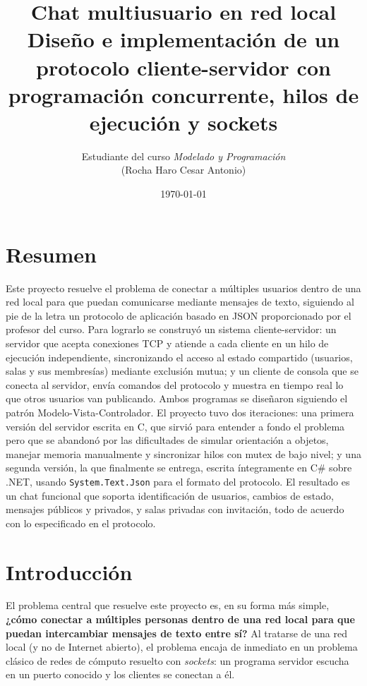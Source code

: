 \documentclass[11pt,letterpaper]{article}
\title{\textbf{Chat multiusuario en red local}\\[0.3em]
  \large Diseño e implementación de un protocolo cliente-servidor con\\
  programación concurrente, hilos de ejecución y sockets}
\author{Estudiante del curso \emph{Modelado y Programación}\\ \small(Rocha Haro Cesar Antonio)}
\date{\today}
\begin{document}
\maketitle
\thispagestyle{empty}
\tableofcontents
\newpage

\section{Resumen}

Este proyecto resuelve el problema de conectar a múltiples usuarios dentro
de una red local para que puedan comunicarse mediante mensajes de texto,
siguiendo al pie de la letra un protocolo de aplicación basado en JSON
proporcionado por el profesor del curso. Para lograrlo se construyó un
sistema cliente-servidor: un servidor que acepta conexiones TCP y atiende a
cada cliente en un hilo de ejecución independiente, sincronizando el acceso
al estado compartido (usuarios, salas y sus membresías) mediante exclusión
mutua; y un cliente de consola que se conecta al servidor, envía comandos
del protocolo y muestra en tiempo real lo que otros usuarios van
publicando. Ambos programas se diseñaron siguiendo el patrón
Modelo-Vista-Controlador. El proyecto tuvo dos iteraciones: una primera
versión del servidor escrita en C, que sirvió para entender a fondo el
problema pero que se abandonó por las dificultades de simular
orientación a objetos, manejar memoria manualmente y sincronizar hilos con
mutex de bajo nivel; y una segunda versión, la que finalmente se entrega,
escrita íntegramente en C\# sobre .NET, usando \texttt{System.Text.Json}
para el formato del protocolo. El resultado es un chat funcional que
soporta identificación de usuarios, cambios de estado, mensajes públicos y
privados, y salas privadas con invitación, todo de acuerdo con lo
especificado en el protocolo.

\section{Introducción}

El problema central que resuelve este proyecto es, en su forma más simple,
\textbf{¿cómo conectar a múltiples personas dentro de una red local para que
puedan intercambiar mensajes de texto entre sí?} Al tratarse de una red
local (y no de Internet abierto), el problema encaja de inmediato en un
problema clásico de redes de cómputo resuelto con \emph{sockets}: un
programa servidor escucha en un puerto conocido y los clientes se conectan
a él.
\end{document}
